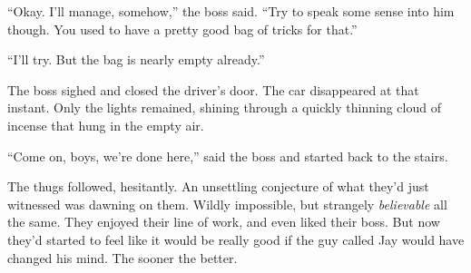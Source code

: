 ``Okay. I'll manage, somehow,'' the boss said. ``Try to speak some sense into him though. You used to have a pretty good bag of tricks for that.''

``I'll try. But the bag is nearly empty already.''

The boss sighed and closed the driver's door. The car disappeared at that instant. Only the lights remained, shining through a quickly thinning cloud of incense that hung in the empty air.

``Come on, boys, we're done here,'' said the boss and started back to the stairs.
 
The thugs followed, hesitantly. An unsettling conjecture of what they'd just witnessed was dawning on them. Wildly impossible, but strangely \emph{believable} all the same. They enjoyed their line of work, and even liked their boss. But now they'd started to feel like it would be really good if the guy called Jay would have changed his mind. The sooner the better. 
